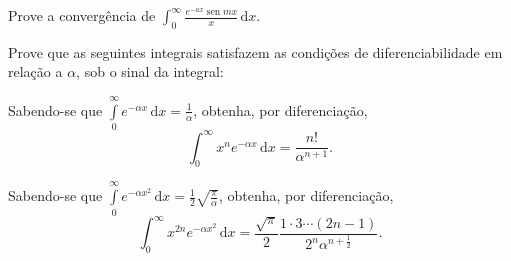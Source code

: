 \documentclass[11pt, a5paper]{exam}
\DeclareMathOperator{\sen}{sen}
\newcommand{\dd}{\,\mathrm{d}}
\begin{document}
\begin{questions}
\question 
Prove a convergência de $ \displaystyle \int_{0}^{\infty} \frac{e^{-ax}\sen{mx}}{x} \dd{x} $.

\question 
Prove que as seguintes integrais satisfazem as condições de diferenciabilidade 
em relação a $ \alpha $, sob o sinal da integral:
\begin{multicols}{2}
\end{multicols}

\question 
Sabendo-se que $ \int\limits_{0}^{\infty} e^{-\alpha x} \dd{x} = \frac{1}{\alpha} $,
obtenha, por diferenciação,
\[
  \int_{0}^{\infty} x^n e^{-\alpha x} \dd{x} = \frac{n!}{\alpha^{n + 1}}.
\]

\question 
Sabendo-se que $ \int\limits_{0}^{\infty} e^{-\alpha x^2} \dd{x} = \frac{1}{2} \sqrt{\frac{\pi}{\alpha}} $,
obtenha, por diferenciação,
\[
  \int_{0}^{\infty} x^{2n} e^{-\alpha x^2} \dd{x} = \frac{\sqrt{\pi}}{2}\frac{1 \cdot 3 \cdots (2n -1)}{2^n\alpha^{n + \frac{1}{2}}}.
\]


\end{questions}
\end{document}
